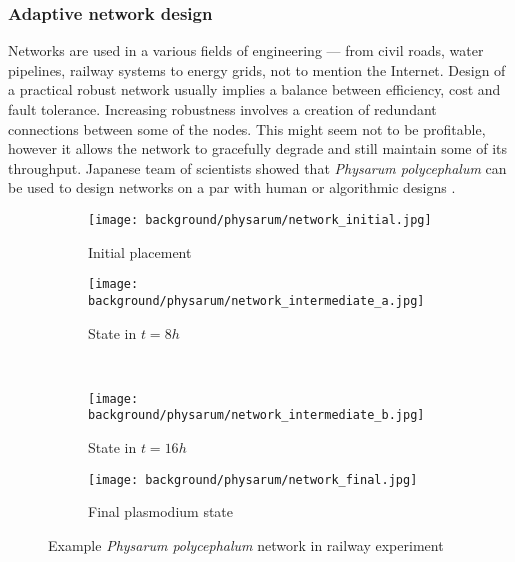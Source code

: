 \subsubsection{Adaptive network design}

Networks are used in a various fields of engineering --- from civil roads, water pipelines, railway systems to energy grids, not to mention the Internet. Design of a practical robust network usually implies a balance between efficiency, cost and fault tolerance. Increasing robustness involves a creation of redundant connections between some of the nodes. This might seem not to be profitable, however it allows the network to gracefully degrade and still maintain some of its throughput. Japanese team of scientists showed that \textit{Physarum polycephalum} can be used to design networks on a par with human or algorithmic designs \cite{tero2010rules}.

\begin{figure}
  \centering
  \begin{subfigure}{0.33\textwidth}
    \centering
    \texttt{[image: background/physarum/network\_initial.jpg]}
    \caption{Initial placement}
    \label{figure:bp_network_initial}
  \end{subfigure}
  \begin{subfigure}{0.33\textwidth}
    \centering
    \texttt{[image: background/physarum/network\_intermediate\_a.jpg]}
    \caption{State in $t=8h$}
    \label{figure:bp_network_intermediate_a}
  \end{subfigure}
  \\
  \begin{subfigure}{0.33\textwidth}
    \centering
    \texttt{[image: background/physarum/network\_intermediate\_b.jpg]}
    \caption{State in $t=16h$}
    \label{figure:bp_network_intermediate_b}
  \end{subfigure}
  \begin{subfigure}{0.33\textwidth}
    \centering
    \texttt{[image: background/physarum/network\_final.jpg]}
    \caption{Final plasmodium state}
    \label{figure:bp_network_final}
  \end{subfigure}
  \caption{Example \textit{Physarum polycephalum} network in railway experiment \cite{tero2010rules}}
\end{figure}

